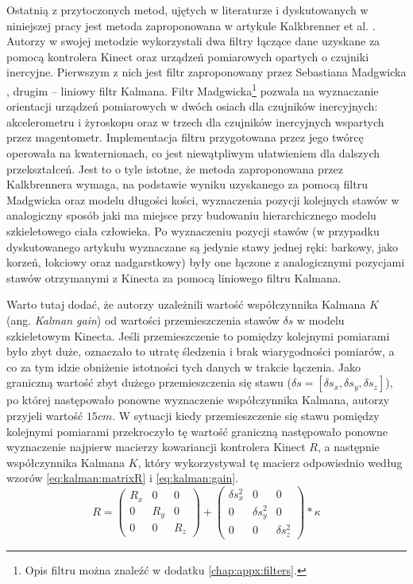 	Ostatnią z przytoczonych metod, ujętych w literaturze i dyskutowanych w niniejszej pracy jest metoda zaproponowana w artykule Kalkbrenner et al. \cite{Kalkbrenner2014}. Autorzy w swojej metodzie wykorzystali dwa filtry łączące dane uzyskane za pomocą kontrolera Kinect oraz urządzeń pomiarowych opartych o czujniki inercyjne. Pierwszym z nich jest filtr zaproponowany przez Sebastiana Madgwicka \cite{Kalkbrenner2014}, drugim -- liniowy filtr Kalmana. Filtr Madgwicka\footnote{Opis filtru można znaleźć w dodatku \ref{chap:appx:filters}.} pozwala na wyznaczanie orientacji urządzeń pomiarowych w dwóch osiach dla czujników inercyjnych: akcelerometru i żyroskopu oraz w trzech dla czujników inercyjnych wspartych przez magentometr. Implementacja filtru przygotowana przez jego twórcę operowała na kwaternionach, co jest niewątpliwym ułatwieniem dla dalszych przekształceń. Jest to o tyle istotne, że metoda zaproponowana przez Kalkbrennera wymaga, na podstawie wyniku uzyskanego za pomocą filtru Madgwicka oraz modelu długości kości, wyznaczenia pozycji kolejnych stawów  w analogiczny sposób jaki ma miejsce przy budowaniu hierarchicznego modelu szkieletowego ciała człowieka. Po wyznaczeniu pozycji stawów (w przypadku dyskutowanego artykułu wyznaczane są jedynie stawy jednej ręki: barkowy, jako korzeń, łokciowy oraz nadgarstkowy) były one łączone z analogicznymi pozycjami stawów otrzymanymi z Kinecta za pomocą liniowego filtru Kalmana. 
		
	Warto tutaj dodać, że autorzy uzależnili wartość współczynnika Kalmana $K$ (ang. \emph{Kalman gain}) od wartości przemieszczenia stawów $\delta s$ w modelu szkieletowym Kinecta. Jeśli przemieszczenie to pomiędzy kolejnymi pomiarami było zbyt duże, oznaczało to utratę śledzenia i brak wiarygodności pomiarów, a co za tym idzie obniżenie istotności tych danych w trakcie łączenia. Jako graniczną wartość zbyt dużego przemieszczenia się stawu ($\delta s = [\delta s_x, \delta s_y, \delta s_z]$), po której następowało ponowne wyznaczenie współczynnika Kalmana, autorzy przyjeli wartość $15cm$. W sytuacji kiedy przemieszczenie się stawu pomiędzy kolejnymi pomiarami przekroczyło tę wartość graniczną następowało ponowne wyznaczenie najpierw macierzy kowariancji kontrolera Kinect $R$, a następnie współczynnika Kalmana $K$, który wykorzystywał tę macierz odpowiednio według wzorów \eqref{eq:kalman:matrixR} i \eqref{eq:kalman:gain}.
	\begin{equation}
		R = 
		\begin{pmatrix}
			R_x & 0   & 0   \\
			0   & R_y & 0   \\
			0   & 0   & R_z 
		\end{pmatrix} +
		\begin{pmatrix}
			\delta s_x^2 & 0            & 0            \\
			0            & \delta s_y^2 & 0            \\
			0            & 0            & \delta s_z^2 
		\end{pmatrix} * \kappa
		\label{eq:kalman:matrixR}
	\end{equation}
		
